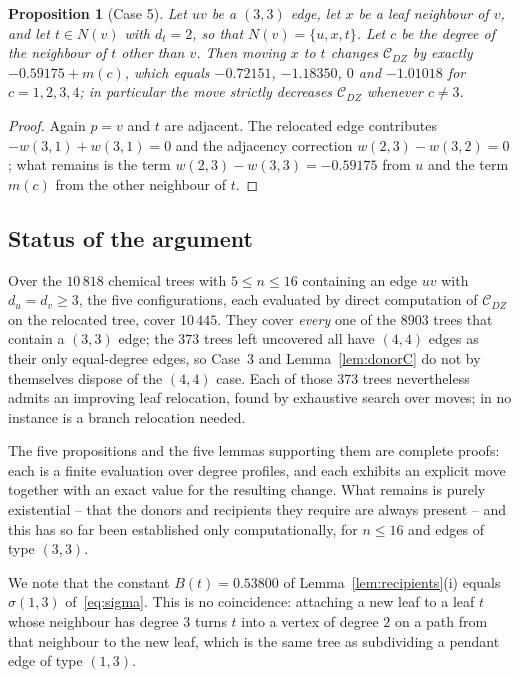 \documentclass[11pt,a4paper]{article}
\theoremstyle{plain}
\newtheorem{proposition}[theorem]{Proposition}
\theoremstyle{definition}
\theoremstyle{remark}
\newcommand{\CDZ}{\mathcal{C}_{DZ}}
\begin{document}
\begin{proposition}[Case 5]
\label{prop:case5}
Let $uv$ be a $(3,3)$ edge, let $x$ be a leaf neighbour of $v$, and let
$t\in N(v)$ with $d_t=2$, so that $N(v)=\{u,x,t\}$. Let $c$ be the degree of the
neighbour of $t$ other than $v$. Then moving $x$ to $t$ changes $\CDZ$ by exactly
$-0.59175+m(c)$, which equals $-0.72151$, $-1.18350$, $0$ and $-1.01018$ for
$c=1,2,3,4$; in particular the move strictly decreases $\CDZ$ whenever $c\ne3$.
\end{proposition}

\begin{proof}
Again $p=v$ and $t$ are adjacent. The relocated edge contributes
$-w(3,1)+w(3,1)=0$ and the adjacency correction $w(2,3)-w(3,2)=0$; what remains
is the term $w(2,3)-w(3,3)=-0.59175$ from $u$ and the term $m(c)$ from the other
neighbour of $t$.
\end{proof}

\subsection*{Status of the argument}

Over the $10\,818$ chemical trees with $5\le n\le16$ containing an edge $uv$
with $d_u=d_v\ge3$, the five configurations, each evaluated by direct
computation of $\CDZ$ on the relocated tree, cover $10\,445$. They cover
\emph{every} one of the $8903$ trees that contain a $(3,3)$ edge; the $373$ trees
left uncovered all have $(4,4)$ edges as their only equal-degree edges, so
Case~3 and Lemma~\ref{lem:donorC} do not by themselves dispose of the $(4,4)$
case. Each of those $373$ trees nevertheless admits an improving leaf
relocation, found by exhaustive search over moves; in no instance is a branch
relocation needed.

The five propositions and the five lemmas supporting them are complete proofs:
each is a finite evaluation over degree profiles, and each exhibits an explicit
move together with an exact value for the resulting change. What remains is
purely existential -- that the donors and recipients they require are always
present -- and this has so far been established only computationally, for
$n\le16$ and edges of type $(3,3)$.

We note that the constant $B(t)=0.53800$ of Lemma~\ref{lem:recipients}(i)
equals $\sigma(1,3)$ of~\eqref{eq:sigma}. This is no coincidence: attaching a
new leaf to a leaf $t$ whose neighbour has degree $3$ turns $t$ into a vertex of
degree $2$ on a path from that neighbour to the new leaf, which is the same tree
as subdividing a pendant edge of type $(1,3)$.
\end{document}
